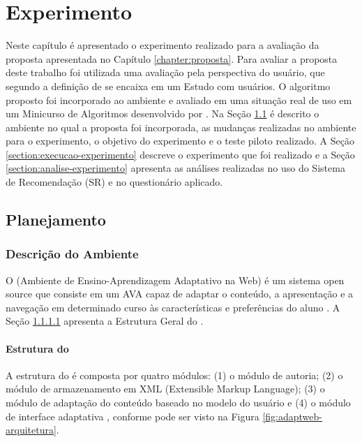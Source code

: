 \chapter{Experimento}\label{chapter:experimento}

Neste capítulo é apresentado o experimento realizado para a avaliação da proposta apresentada no Capítulo \ref{chapter:proposta}.
Para avaliar a proposta deste trabalho foi utilizada uma avaliação pela perspectiva do usuário, que segundo a definição de
 se encaixa em um Estudo com usuários. O algoritmo proposto foi incorporado ao ambiente
\adaptwebspace e avaliado em uma situação real de uso em um Minicurso de Algoritmos desenvolvido por .
Na Seção \ref{section:planejamento-experimento} é descrito o ambiente \adaptwebspace no qual a proposta foi incorporada,
as mudanças realizadas no ambiente para o experimento, o objetivo do experimento e o teste piloto realizado. A Seção
\ref{section:execucao-experimento} descreve o experimento que foi realizado e a Seção \ref{section:analise-experimento} apresenta
as análises realizadas no uso do Sistema de Recomendação (SR) e no questionário aplicado.

\section{Planejamento}\label{section:planejamento-experimento}

\subsection{Descrição do Ambiente \adaptweb}

O \adaptwebspace (Ambiente de Ensino-Aprendizagem Adaptativo na Web) é um sistema open source
que consiste em um AVA capaz de adaptar o conteúdo, a apresentação e a navegação em determinado curso às características
e preferências do aluno \cite{gasparini2009adaptweb}. A Seção \ref{subsection:estrutura-adaptweb} apresenta a Estrutura Geral do
\adaptweb.

\subsubsection{Estrutura do \adaptweb}\label{subsection:estrutura-adaptweb}

A estrutura do \adaptwebspace é composta por quatro módulos: (1) o módulo de autoria; (2) o
módulo de armazenamento em XML (Extensible Markup Language); (3) o módulo de adaptação do conteúdo baseado no modelo do
usuário e (4) o módulo de interface adaptativa \cite{gasparini2003interface}, conforme pode ser visto na Figura
\ref{fig:adaptweb-arquitetura}.


